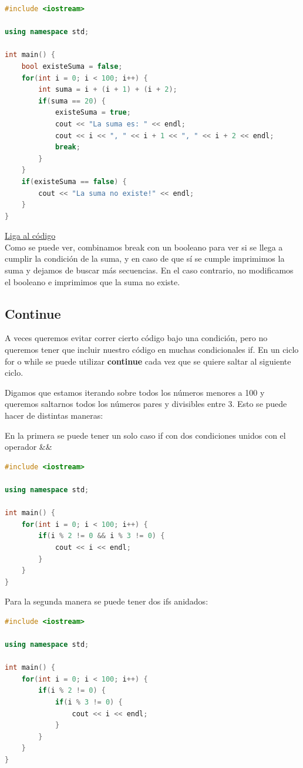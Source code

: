 \documentclass{article}
\begin{document}
\begin{lstlisting}[language=C++, caption=Break]
#include <iostream>

using namespace std;

int main() {
    bool existeSuma = false;
    for(int i = 0; i < 100; i++) {
        int suma = i + (i + 1) + (i + 2);
        if(suma == 20) {
            existeSuma = true;
            cout << "La suma es: " << endl;
            cout << i << ", " << i + 1 << ", " << i + 2 << endl;
            break;
        }
    }
    if(existeSuma == false) {
        cout << "La suma no existe!" << endl;
    }
}
\end{lstlisting}
\href{https://repl.it/@Jamesscn/Suma-Triple}{Liga al código}\\

Como se puede ver, combinamos break con un booleano para ver si se llega a cumplir la condición de la suma, y en caso de que sí se cumple imprimimos la suma y dejamos de buscar más secuencias. En el caso contrario, no modificamos el booleano e imprimimos que la suma no existe.

\subsection{Continue}

A veces queremos evitar correr cierto código bajo una condición, pero no queremos tener que incluir nuestro código en muchas condicionales if. En un ciclo for o while se puede utilizar \textbf{continue} cada vez que se quiere saltar al siguiente ciclo.

Digamos que estamos iterando sobre todos los números menores a 100 y queremos saltarnos todos los números pares y divisibles entre 3. Esto se puede hacer de distintas maneras:

En la primera se puede tener un solo caso if con dos condiciones unidos con el operador \&\&

\begin{lstlisting}[language=C++, caption=Condiciones con and]
#include <iostream>

using namespace std;

int main() {
    for(int i = 0; i < 100; i++) {
        if(i % 2 != 0 && i % 3 != 0) {
            cout << i << endl;
        }
    }
}
\end{lstlisting}

Para la segunda manera se puede tener dos ifs anidados:

\begin{lstlisting}[language=C++, caption=Dos condiciones]
#include <iostream>

using namespace std;

int main() {
    for(int i = 0; i < 100; i++) {
        if(i % 2 != 0) {
            if(i % 3 != 0) {
                cout << i << endl;
            }
        }
    }
}
\end{lstlisting}
\end{document}

